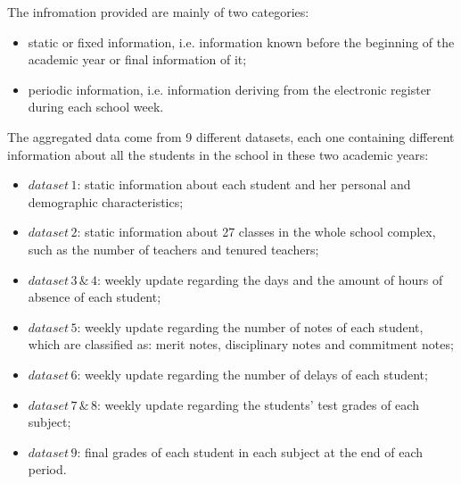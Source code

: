 The infromation provided are mainly of two categories:
\begin{itemize}
    \item static or fixed information, i.e. information known before the beginning of the academic year or final information of it;
    \item periodic information, i.e. information deriving from the electronic register during each school week.
\end{itemize}
The aggregated data come from 9 different datasets, each one containing different information about all the students in the school in these two academic years:
\begin{itemize}
    \item \(dataset \, 1\): static information about each student and her personal and demographic characteristics;
    \item \(dataset \, 2\): static information about 27 classes in the whole school complex, such as the number of teachers and tenured teachers;
    \item \(dataset \, 3 \, \& \, 4\): weekly update regarding the days and the amount of hours of absence of each student;
    \item \(dataset \, 5\): weekly update regarding the number of notes of each student, which are classified as: merit notes, disciplinary notes and commitment notes;
    \item \(dataset \, 6\): weekly update regarding the number of delays of each student;
    \item \(dataset \, 7 \, \& \, 8\): weekly update regarding the students' test grades of each subject;
    \item \(dataset \, 9\): final grades of each student in each subject at the end of each period.
\end{itemize}

